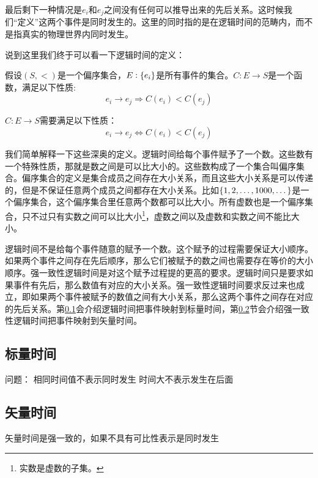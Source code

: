 最后剩下一种情况是$e_i$和$e_j$之间没有任何可以推导出来的先后关系。这时候我们“定义”这两个事件是同时发生的。这里的同时指的是在逻辑时间的范畴内，而不是指真实的物理世界内同时发生。


说到这里我们终于可以看一下逻辑时间的定义：

\begin{definition}
    假设$(S,<)$是一个偏序集合，$E:\set{e_i}$是所有事件的集合。$C: E \rightarrow S$是一个函数，满足以下性质:
    \begin{equation}
        e_i \rightarrow e_j \Rightarrow C(e_i) < C(e_j) 
    \end{equation}
    
    $C: E \rightarrow S$需要满足以下性质：
    \begin{equation}
        e_i \rightarrow e_j \Leftrightarrow C(e_i) < C(e_j) 
    \end{equation}
\end{definition}

我们简单解释一下这些深奥的定义。逻辑时间给每个事件赋予了一个数。这些数有一个特殊性质，那就是数之间是可以比大小的。这些数构成了一个集合叫偏序集合。偏序集合的定义是集合成员之间存在大小关系，而且这些大小关系是可以传递的，但是不保证任意两个成员之间都存在大小关系。比如$\set{1,2,\dots, 1000,\dots}$是一个偏序集合，这个偏序集合里任意两个数都可以比大小。所有虚数也是一个偏序集合，只不过只有实数之间可以比大小\footnote{实数是虚数的子集。}，虚数之间以及虚数和实数之间不能比大小。

逻辑时间不是给每个事件随意的赋予一个数。这个赋予的过程需要保证大小顺序。如果两个事件之间存在先后顺序，那么它们被赋予的数之间也需要存在等价的大小顺序。强一致性逻辑时间是对这个赋予过程提的更高的要求。逻辑时间只是要求如果事件有先后，那么数值有对应的大小关系。强一致性逻辑时间要求反过来也成立，即如果两个事件被赋予的数值之间有大小关系，那么这两个事件之间存在对应的先后关系。第\ref{scalarclock}会介绍逻辑时间把事件映射到标量时间，第\ref{vectorclock}节会介绍强一致性逻辑时间把事件映射到矢量时间。


\subsection{标量时间}\label{scalarclock}

问题：
相同时间值不表示同时发生
时间大不表示发生在后面

\subsection{矢量时间}\label{vectorclock}
矢量时间是强一致的，如果不具有可比性表示是同时发生
